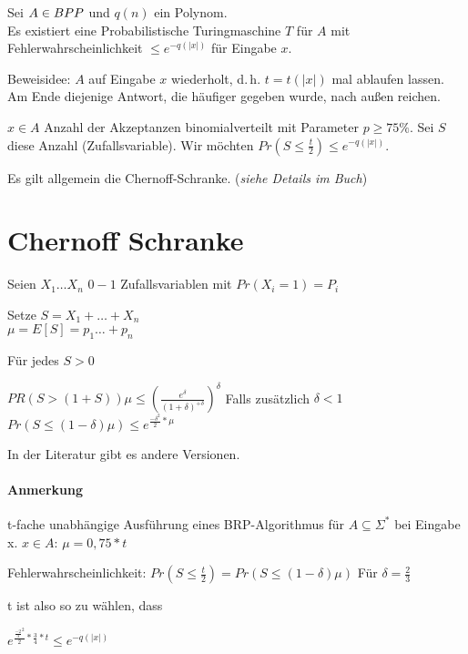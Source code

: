 \begin{satz}
    Sei $A \in BPP$ und $q(n)$ ein Polynom.
    \\
    Es existiert eine Probabilistische Turingmaschine $T$ für $A$
    mit Fehlerwahrscheinlichkeit $\leq e^{-q(|x|)}$ für Eingabe $x$.
\end{satz}
\begin{beweis}
    Beweisidee: $A$ auf Eingabe $x$ wiederholt, d.\,h. $t = t(|x|)$ mal ablaufen lassen.
    Am Ende diejenige Antwort, die häufiger gegeben wurde, nach außen reichen.

    $x \in A$ Anzahl der Akzeptanzen binomialverteilt mit Parameter $p \geq 75\%$.
    Sei $S$ diese Anzahl (Zufallsvariable).
    Wir möchten $Pr(S \leq \frac{t}{2}) \leq e^{-q(|x|)}$.

    Es gilt allgemein die Chernoff-Schranke.
    (\textit{siehe Details im Buch})

\end{beweis}


\section{Chernoff Schranke}
Seien $X_1 \dots X_n$ $0-1$
Zufallsvariablen mit $Pr(X_i=1) = P_i$

Setze $S=X_1 + \dots + X_n$ \\
$\mu = E[S] = p_1 \dots  + p_n$

Für jedes $S > 0$

$PR (S>(1+S)) \mu \leq (\frac{e^\delta}{(1+\delta)^{+\delta}})^\delta$
Falls zusätzlich $\delta < 1$ \\
$Pr(S\leq (1- \delta) \mu ) \leq e^{\frac{- \delta^2}{2} * \mu}$

In der Literatur gibt es andere Versionen.

\paragraph{Anmerkung}
t-fache unabhängige Ausführung eines BRP-Algorithmus für
$A\subseteq \Sigma^*$ bei Eingabe x. $x \in A$: $\mu = 0,75 * t$

Fehlerwahrscheinlichkeit:
$Pr(S\leq \frac{t}{2}) = Pr(S \leq (1 - \delta) \mu)$
Für $\delta = \frac{2}{3}$

t ist also so zu wählen, dass

$e ^ {\frac{\frac{-2}{3}^2}{2} * \frac{3}{4} * t} \leq e^{-q(|x|)}$


